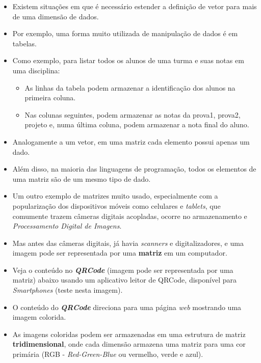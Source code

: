 \documentclass[12pt,a4paper]{article}
\providecommand{\tightlist}{%
      \setlength{\itemsep}{0pt}\setlength{\parskip}{0pt}}
\begin{document}
    \begin{itemize}
\item
  Existem situações em que é necessário estender a definição de vetor
  para mais de uma dimensão de dados.
\item
  Por exemplo, uma forma muito utilizada de manipulação de dados é em
  tabelas.
\item
  Como exemplo, para listar todos os alunos de uma turma e suas notas em
  uma disciplina:

  \begin{itemize}
  \tightlist
  \item
    As linhas da tabela podem armazenar a identificação dos alunos na
    primeira coluna.
  \item
    Nas colunas seguintes, podem armazenar as notas da prova1, prova2,
    projeto e, numa última coluna, podem armazenar a nota final do
    aluno.
  \end{itemize}
\item
  Analogamente a um vetor, em uma matriz cada elemento possui apenas um
  dado.
\item
  Além disso, na maioria das linguagens de programação, todos os
  elementos de uma matriz são de um mesmo tipo de dado.
\end{itemize}

    \begin{itemize}
\item
  Um outro exemplo de matrizes muito usado, especialmente com a
  popularização dos dispositivos móveis como celulares e \emph{tablets},
  que comumente trazem câmeras digitais acopladas, ocorre no
  armazenamento e \emph{Processamento Digital de Imagens}.
\item
  Mas antes das câmeras digitais, já havia \emph{scanners} e
  digitalizadores, e uma imagem pode ser representada por uma
  \textbf{matriz} em um computador.
\item
  Veja o conteúdo no \textbf{\emph{QRCode}} (imagem pode ser
  representada por uma matriz) abaixo usando um aplicativo leitor de
  QRCode, disponível para \emph{Smartphones} (teste nesta imagem).
\item
  O conteúdo do \textbf{\emph{QRCode}} direciona para uma página
  \emph{web} mostrando uma imagem colorida.
\item
  As imagens coloridas podem ser armazenadas em uma estrutura de matriz
  \textbf{tridimensional}, onde cada dimensão armazena uma matriz para
  uma cor primária (RGB - \emph{Red-Green-Blue} ou vermelho, verde e
  azul).
\end{itemize}
\end{document}
